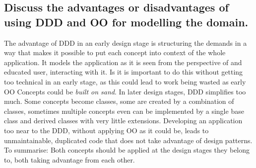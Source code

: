 		\subsection{Discuss the advantages or disadvantages of using DDD and OO for modelling
			the domain.}

		The advantage of DDD in an early design stage is structuring the demands in a way that makes it possible to put each concept into context of the whole application.
		It models the application as it is seen from the perspective of and educated user, interacting with it.
		Is it is important to do this without getting too technical in an early stage, as this could lead to work being wasted as early OO Concepts could be \textit{built on sand}.
		In later design stages, DDD simplifies too much.
		Some concepts become classes, some are created by a combination of classes, sometimes multiple concepts even can be implemented by a single base class and derived classes with very little extensions.
		Developing an application too near to the DDD, without applying OO as it could be, leads to unmaintainable, duplicated code that does not take advantage of design patterns.
		To summarise: Both concepts should be applied at the design stages they belong to, both taking advantage from each other.